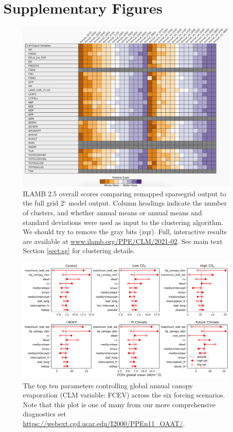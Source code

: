 \documentclass[draft]{agujournal2019}
\begin{document}


\appendix
\section{Supplementary Figures}


\begin{figure}[h]
\centering
\includegraphics[width=42pc]{../figs/supp/ilamb.pdf}
\caption{ILAMB 2.5 overall scores comparing remapped sparsegrid output to the full grid 2$^{\circ}$ model output. Column headings indicate the number of clusters, and whether annual means or annual means and standard deviations were used as input to the clustering algorithm. We should try to remove the gray bits (zqz). Full, interactive results are available at \url{www.ilamb.org/PPE/CLM/2021-02}. See main text Section \ref{sect:sg} for clustering details.}
\label{supp:ilamb}
\end{figure}

\begin{figure}[h]
\centering
\includegraphics[width=\textwidth]{../figs/supp/FCEV_global_mean.png}
\caption{The top ten parameters controlling global annual canopy evaporation (CLM variable: FCEV) across the six forcing scenarios. Note that this plot is one of many from our more comprehensive diagnostics set \url{https://webext.cgd.ucar.edu/I2000/PPEn11_OAAT/}.}
\label{supp:fcev}
\end{figure}
\end{document}

